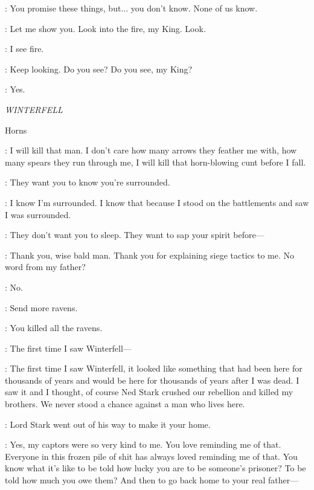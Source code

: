 \STANNIS: You promise these things, but$\ldots$ you don't know. None of us know. 

\MELISANDRE: Let me show you.  Look into the fire, my King. Look. 

\STANNIS: I see fire. 

\MELISANDRE: Keep looking. Do you see? Do you see, my King? 


\STANNIS: Yes. 


\scene

\textit{WINTERFELL} 

\sfx Horns


\THEON: I will kill that man. I don't care how many arrows they feather me with, how many spears they run through me, I will kill that horn-blowing cunt before I fall. 

\LUWIN: They want you to know you're surrounded. 

\THEON: I know I'm surrounded. I know that because I stood on the battlements and saw I was surrounded. 

\LUWIN: They don't want you to sleep. They want to sap your spirit before---  

\THEON: Thank you, wise bald man. Thank you for explaining siege tactics to me. No word from my father? 

\LUWIN: No. 

\THEON: Send more ravens. 

\LUWIN: You killed all the ravens. 

\THEON: The first time I saw Winterfell--- 


\THEON: The first time I saw Winterfell, it looked like something that had been here for thousands of years and would be here for thousands of years after I was dead. I saw it and I thought, of course Ned Stark crushed our rebellion and killed my brothers. We never stood a chance against a man who lives here. 

\LUWIN: Lord Stark went out of his way to make it your home. 

\THEON: Yes, my captors were so very kind to me. You love reminding me of that. Everyone in this frozen pile of shit has always loved reminding me of that. You know what it's like to be told how lucky you are to be someone's prisoner? To be told how much you owe them? And then to go back home to your real father---

